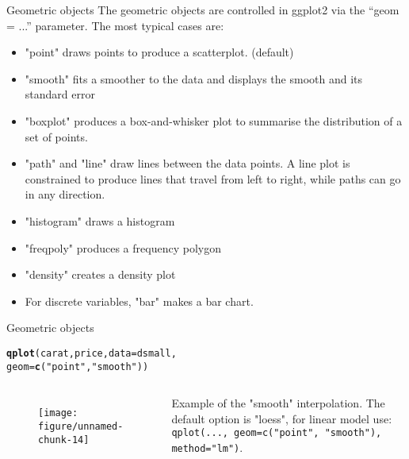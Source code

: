 \documentclass{beamer}\usepackage[]{graphicx}\usepackage[]{color}
\makeatletter
\def\maxwidth{ %
  \ifdim\Gin@nat@width>\linewidth
    \linewidth
  \else
    \Gin@nat@width
  \fi
}
\newcommand{\hlstr}[1]{\textcolor[rgb]{0.192,0.494,0.8}{#1}}%
\newcommand{\hlstd}[1]{\textcolor[rgb]{0.345,0.345,0.345}{#1}}%
\newcommand{\hlkwc}[1]{\textcolor[rgb]{0.333,0.667,0.333}{#1}}%
\newcommand{\hlkwd}[1]{\textcolor[rgb]{0.737,0.353,0.396}{\textbf{#1}}}%
\newenvironment{kframe}{%
 \def\at@end@of@kframe{}%
 \ifinner\ifhmode%
  \def\at@end@of@kframe{\end{minipage}}%
  \begin{minipage}{\columnwidth}%
 \fi\fi%
 \def\FrameCommand##1{\hskip\@totalleftmargin \hskip-\fboxsep
 \colorbox{shadecolor}{##1}\hskip-\fboxsep
     \hskip-\linewidth \hskip-\@totalleftmargin \hskip\columnwidth}%
 \MakeFramed {\advance\hsize-\width
   \@totalleftmargin\z@ \linewidth\hsize
   \@setminipage}}%
 {\par\unskip\endMakeFramed%
 \at@end@of@kframe}
\newenvironment{knitrout}{}{} %
\makeatother
\begin{document}
\begin{frame}[containsverbatim]{Geometric objects }
The geometric objects are controlled in ggplot2 via the ``geom = ...'' parameter. The most typical cases are:
\begin{itemize}
\item "point" draws points to produce a scatterplot. (default)
\item "smooth" fits a smoother to the data and displays the smooth and
its standard error
\item "boxplot" produces a box-and-whisker plot to summarise the
distribution of a set of points.
\item "path" and "line" draw lines between the data points. A line plot is constrained to produce lines that travel from left to right, while paths can go in any direction.
\item "histogram" draws a histogram
\item "freqpoly" produces a frequency polygon
\item "density" creates a density plot
\item For discrete variables, "bar" makes a bar chart.
\end{itemize}
\end{frame}

\begin{frame}[containsverbatim]{Geometric objects}
\begin{knitrout}\footnotesize
{}\color{fgcolor}\begin{kframe}
\begin{alltt}
\hlkwd{qplot}\hlstd{(carat, price,} \hlkwc{data} \hlstd{= dsmall,}
\hlkwc{geom} \hlstd{=} \hlkwd{c}\hlstd{(}\hlstr{"point"}\hlstd{,} \hlstr{"smooth"}\hlstd{))}
\end{alltt}
\end{kframe}
\end{knitrout}
\begin{columns}[t] 
\begin{minipage}{1\textwidth}
\begin{figure}[t]
\centering
\begin{knitrout}\footnotesize
{}\color{fgcolor}
\texttt{[image: figure/unnamed-chunk-14]} 

\end{knitrout}
\end{figure}
 \end{minipage}
\begin{minipage}{1\textwidth}
Example of the "smooth" interpolation. The default option is "loess", for linear model use: \texttt{qplot(..., 
geom=c("point",
"smooth"),
method="lm")}.
\end{minipage}
\end{columns}
\end{frame}
\end{document}
